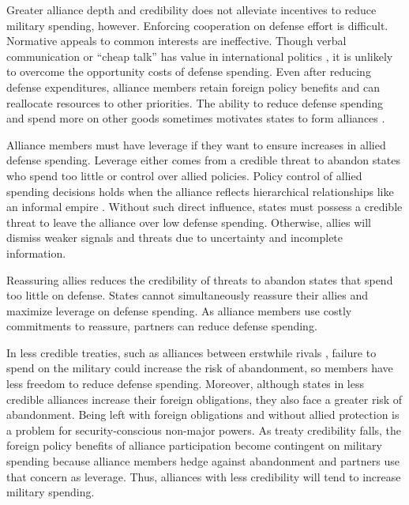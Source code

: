 \documentclass[12pt]{article}
\begin{document}
Greater alliance depth and credibility does not alleviate incentives to reduce military spending, however. 
Enforcing cooperation on defense effort is difficult.
Normative appeals to common interests are ineffective. 
Though verbal communication or ``cheap talk'' has value in international politics \citep{Trager2010}, it is unlikely to overcome the opportunity costs of defense spending. 
Even after reducing defense expenditures, alliance members retain foreign policy benefits and can reallocate resources to other priorities. 
The ability to reduce defense spending and spend more on other goods sometimes motivates states to form alliances \citep{Kimball2010, AllenDigiuseppe2013}. 


Alliance members must have leverage if they want to ensure increases in allied defense spending. 
Leverage either comes from a credible threat to abandon states who spend too little or control over allied policies. 
Policy control of allied spending decisions holds when the alliance reflects hierarchical relationships like an informal empire \citep{Lake1996}. 
Without such direct influence, states must possess a credible threat to leave the alliance over low defense spending. 
Otherwise, allies will dismiss weaker signals and threats due to uncertainty and incomplete information. 


Reassuring allies reduces the credibility of threats to abandon states that spend too little on defense. 
States cannot simultaneously reassure their allies and maximize leverage on defense spending. 
As alliance members use costly commitments to reassure, partners can reduce defense spending. 


In less credible treaties, such as alliances between erstwhile rivals \citep{NiouZeigler2019}, failure to spend on the military could increase the risk of abandonment, so members have less freedom to reduce defense spending. 
Moreover, although states in less credible alliances increase their foreign obligations, they also face a greater risk of abandonment. 
Being left with foreign obligations and without allied protection is a problem for security-conscious non-major powers. 
As treaty credibility falls, the foreign policy benefits of alliance participation become contingent on military spending because alliance members hedge against abandonment and partners use that concern as leverage.
Thus, alliances with less credibility will tend to increase military spending. 
\end{document}
